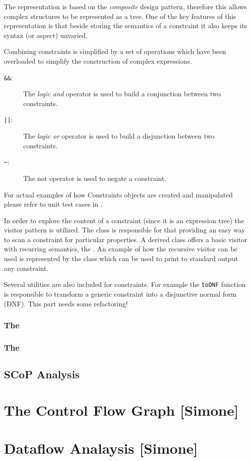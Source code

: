 The representation is based on the {\em composite} design pattern, therefore
this allows complex structures to be represented as a tree. One of the key
features of this representation is that beside storing the semantics of a
constraint it also keeps its syntax (or aspect) unvaried. 

Combining constraints is simplified by a set of operations which have been
overloaded to simplify the construction of complex expressions. 

\begin{description}

	\item[{\tt \&\&}:] The {\em logic and} operator is used to build a conjunction
		between two constraints. 

	\item[{\tt ||}:] The {\em logic or} operator is used to build a disjunction
		between two constraints. 

	\item[{\tt \textasciitilde{}}:] The not operator is used to negate a constraint. 

\end{description}

For actual examples of how Constraints objects are created and manipulated
please refer to unit test cases in
. 


In order to explore the content of a constraint (since it is an expression tree) the visitor
pattern is utilized. The class  is responsible for
that providing an easy way to scan a constraint for particular properties. A
derived class offers a basic visitor with recurring semantics, the
. An example of how the recursive visitor can be
used is represented by the  class which can be used
to print to standard output any constraint. 

Several utilities are also included for constraints. For example the {\tt toDNF}
function is responsible to transform a generic constraint into a disjunctive
normal form (DNF). This part needs some refactoring!


\subsubsection{The }
\subsubsection{The }

\subsection{SCoP Analysis}



\section{The Control Flow Graph [Simone]}
\label{insieme:analysis:cfg}



\section{Dataflow Analaysis [Simone]}
\label{insieme:analysis:dtaflow}
